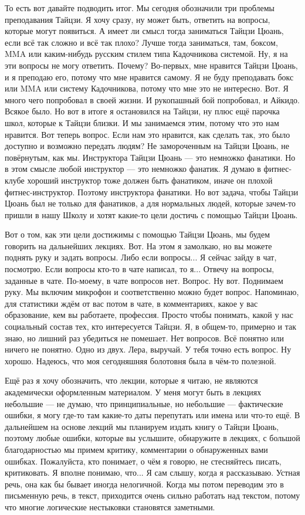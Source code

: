 То есть вот 
давайте подводить итог.  Мы сегодня обозначили три 
проблемы преподавания Тайцзи. Я хочу сразу, ну может 
быть, ответить на вопросы, которые могут появиться.  А 
имеет ли смысл тогда заниматься Тайцзи Цюань, если всё
так сложно и всё так плохо? Лучше тогда заниматься, там, 
боксом, MMA или каким-нибудь русским стилем 
типа Кадочникова системой.  Ну, я на эти вопросы не 
могу ответить. Почему? Во-первых, мне нравится Тайцзи 
Цюань, и я преподаю его, потому что мне нравится 
самому. Я не буду преподавать бокс или MMA или систему 
Кадочникова, потому что мне это не интересно. Вот. Я 
много чего попробовал в своей жизни. И рукопашный бой 
попробовал,  и Айкидо. Всякое было. Но вот в итоге я 
остановился на Тайцзи, ну плюс ещё парочка школ, 
которые к Тайцзи близки.  И мы занимаемся этим, потому 
что это нам нравится. Вот теперь вопрос. Если нам это 
нравится, как сделать так, это было доступно и 
возможно  передать людям? Не замороченным на Тайцзи Цюань,
не повёрнутым, как мы.  Инструктора Тайцзи Цюань
--- это немножко фанатики. Но в этом смысле любой 
инструктор --- это немножко фанатик. Я думаю в 
фитнес-клубе хороший инструктор тоже должен быть 
фанатиком, иначе он плохой фитнес-инструктор.  Поэтому 
инструктора фанатики. Но вот задача, чтобы Тайцзи Цюань
был не только для фанатиков, а для нормальных 
людей, которые зачем-то пришли в нашу Школу и хотят 
какие-то цели достичь с помощью Тайцзи Цюань.

Вот о том, 
как эти цели достижимы с помощью Тайцзи Цюань, мы будем 
говорить на дальнейших лекциях.  Вот. На этом я 
замолкаю, но вы можете поднять руку и задать вопросы.  
Либо если вопросы... Я сейчас зайду в чат, посмотрю. 
Если вопросы кто-то в чате написал, то я... Отвечу на 
вопросы, заданные в чате. По-моему, в чате вопросов нет. 
Вопрос. Ну вот.  Поднимаем руку.  Мы включим микрофон и 
соответственно можно будет вопрос.  Напоминаю, для 
статистики ждём от вас потом в чате, в комментариях,  
какое у вас образование, кем вы работаете, профессия. 
Просто чтобы понимать,  какой у нас социальный состав 
тех, кто интересуется Тайцзи. Я, в общем-то, примерно и 
так знаю,  но лишний раз убедиться не помешает. Нет 
вопросов. Всё понятно или ничего не понятно.  Одно из 
двух.  Лера, выручай. У тебя точно есть вопрос. Ну 
хорошо. Надеюсь,  что моя сегодняшняя болотовня была в 
чём-то полезной.

Ещё раз я хочу обозначить,  что 
лекции, которые я читаю, не являются академически 
оформленным материалом. У меня могут быть в лекциях 
небольшие ---  не думаю, что принципиальные, но небольшие --- 
фактические ошибки, я могу где-то там какие-то даты 
перепутать или имена или что-то ещё.  В дальнейшем на 
основе лекций мы планируем издать книгу о 
Тайцзи Цюань, поэтому любые ошибки, которые вы 
услышите, обнаружите в лекциях, с большой 
благодарностью мы примем критику,  комментарии о 
обнаруженных вами ошибках. Пожалуйста, кто понимает, о 
чём я говорю, не стесняйтесь писать,  критиковать.  Я 
вполне понимаю, что... Я сам слышу, когда я рассказываю.
Устная речь, она как бы бывает иногда нелогичной.  
Когда мы потом переводим это в письменную речь, в 
текст, приходится очень сильно работать над текстом, 
потому что многие логические нестыковки становятся 
заметными.

\bye
